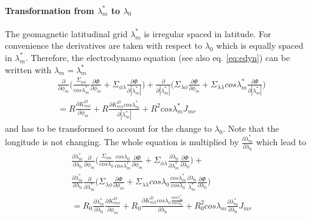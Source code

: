 \paragraph{Transformation from $\lambda_m^*$ to $\lambda_0$}
%
The geomagnetic latitudinal grid $\lambda_m^*$ is irregular spaced in latitude.
For convenience the derivatives are taken with respect to $\lambda_0$ which is 
equally spaced in $\lambda_m^*$. Therefore, the electrodynamo 
equation (see also eq. \ref{eq:edyn}) can be written
with $\lambda_m = \lambda_m^*$
%
\begin{equation}
 \begin{split}
  & \frac{\partial}{\partial \phi_m} \bigl( \frac{\Sigma_{\phi \phi}}{cos
   \lambda_m^*} \frac{\partial \Phi}{\partial \phi_m} + 
   \Sigma_{\phi \lambda} \frac{\partial \Phi}{\partial |\lambda_m^*|} \bigr) +
   \frac{\partial}{\partial | \lambda_m^* |} \bigl( \Sigma_{\lambda \phi}
    \frac{\partial \Phi}{\partial \phi_m} + 
   \Sigma_{\lambda \lambda} cos \lambda_m^* 
   \frac{\partial \Phi}{\partial |\lambda_m^*|} \bigr) \\
  &  =
   R \frac{\partial K_{m \phi}^{D}}{\partial \phi_m} +  
   R \frac{\partial K_{m \lambda}^{D} cos \lambda_m^* }{\partial | \lambda_m^* |} +
   R^2 cos \lambda_m^* J_{mr}
    \label{eq:edyn2}
  \end{split}
\end{equation}
%
and has to be transformed to account for the change to $\lambda_0$. 
Note that the longitude is not
changing. The whole equation is multiplied by 
$\frac{\partial \lambda_m^*}{\partial\lambda_0}$ which lead to
%
\begin{equation}
 \begin{split}
  & \frac{\partial \lambda_m^*}{\partial\lambda_0}\frac{\partial}{\partial \phi_m} 
    \bigl( \frac{\Sigma_{\phi \phi}}{cos
   \lambda_0}\frac{cos \lambda_0}{cos \lambda_m^*} \frac{\partial \Phi}{\partial \phi_m} + 
   \Sigma_{\phi \lambda}\frac{\partial \lambda_0}{\partial \lambda_m^*} \frac{\partial \Phi}{\partial
   \lambda_0} \bigr) + \\
  &  \frac{\partial \lambda_m^*}{\partial\lambda_0} \frac{\partial}
   {\partial  \lambda_m^* } \bigl( \Sigma_{\lambda \phi}
    \frac{\partial \Phi}{\partial \phi_m} + 
   \Sigma_{\lambda \lambda} cos \lambda_0 \frac{cos \lambda_m^*}{cos \lambda_0}\frac{\partial
   \lambda_0}{\lambda_m^*}
   \frac{\partial \Phi}{\partial \lambda_0} \bigr) \\
  &  =
   R_0 \frac{\partial \lambda_m^*}{\partial\lambda_0}\frac{\partial K_{m \phi}^{D}}{\partial \phi_m} +  
   R_0 \frac{\partial K_{m \lambda}^{D} cos \lambda_0 \frac{cos \lambda_m^*}{cos \lambda_0}}{\partial  \lambda_0 } +
   R_0^2 cos \lambda_m \frac{\partial \lambda_m^*}{\partial\lambda_0} J_{mr}
    \label{eq:edyn3}
  \end{split}
\end{equation}
